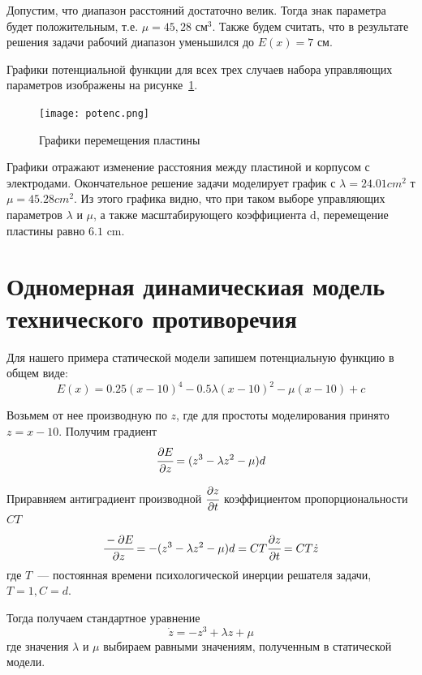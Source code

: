 Допустим, что диапазон расстояний достаточно велик. Тогда знак параметра будет положительным, т.е. $\mu = 45,28$ см$^3$. Также будем считать, что в результате решения задачи рабочий диапазон уменьшился до $E(x)=7$ см.

Графики потенциальной функции для всех трех случаев набора управляющих параметров изображены на рисунке~\ref{potenc}. 

\begin{figure}[h!]
	\centering
	\texttt{[image: potenc.png]}
	\caption{Графики перемещения пластины}
	\label{potenc}
\end{figure}

Графики отражают изменение расстояния между пластиной и корпусом с электродами.
Окончательное решение задачи моделирует график с $\lambda = 24.01 cm^2$ т $\mu = 45.28 cm^2$.
\newpage
Из этого графика видно, что при таком выборе управляющих параметров $\lambda$ и $\mu$, а также масштабирующего коэффициента d, перемещение пластины равно $6.1$ cm. 

\newpage
\section{Одномерная динамическиая модель технического противоречия}

Для нашего примера статической модели запишем потенциальную функцию в общем виде:
\begin{equation}
	E(x) = 0.25 (x-10)^4 - 0.5 \lambda (x-10)^2 - \mu (x-10) + c
\end{equation}

Возьмем от нее производную по $z$, где для простоты моделирования
принято $z = x-10$. Получим градиент
\begin{equation}
	\cfrac{\partial E}{\partial z} = (z^3 - \lambda z^2 - \mu)d
\end{equation}

Приравняем антиградиент производной $\cfrac{\partial z}{\partial t} $ коэффициентом пропорциональности $CT$
\begin{equation}
	\cfrac{- \partial E}{\partial z} = - (z^3 - \lambda z^2 - \mu)d = CT \cfrac{\partial z}{\partial t} = CT \dot z
\end{equation}
где $T$~--- постоянная времени психологической инерции решателя задачи, $T = 1, C = d$.

Тогда получаем стандартное уравнение 
\begin{equation}
	\dot z = -z^3 + \lambda z + \mu
\end{equation}
где значения $\lambda$ и $\mu$ выбираем равными значениям, полученным в статической модели.

